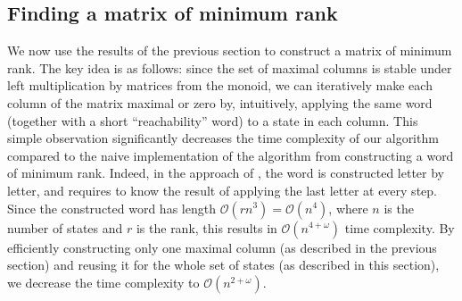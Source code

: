 \documentclass[11pt,a4paper]{amsart}
\newcommand{\OO}{\mathcal{O}}
\theoremstyle{plain}
\theoremstyle{definition}
\theoremstyle{defC}
\theoremstyle{thmC}
\theoremstyle{plain}
\numberwithin{equation}{section}
\begin{document}
\subsection{Finding a matrix of minimum rank}\label{subsec-finding-mat}

We now use the results of the previous section to construct a matrix of minimum rank. The key idea is as follows: since the set of maximal columns is stable under left multiplication by matrices from the monoid, we can iteratively make each column of the matrix maximal or zero by, intuitively, applying the same word (together with a short ``reachability'' word) to a state in each column. This simple observation significantly decreases the time complexity of our algorithm compared to the naive implementation of the algorithm from \cite{Carpi1988} constructing a word of minimum rank. Indeed, in the approach of \cite{Carpi1988}, the word is constructed letter by letter, and requires to know the result of applying the last letter at every step. Since the constructed word has length $\OO(rn^3) = \OO(n^4)$, where $n$ is the number of states and $r$ is the rank, this results in $\OO(n^{4+\omega})$ time complexity. By efficiently constructing only one maximal column (as described in the previous section) and reusing it for the whole set of states (as described in this section), we decrease the time complexity to $\OO(n^{2+\omega})$.
\end{document}
